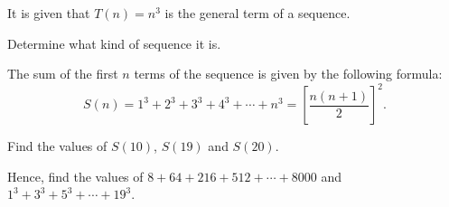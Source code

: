  It is given that $T(n)=n^3$ is the general term of a sequence.

\begin{subparts}
  \item Determine what kind of sequence it is.
  \item The sum of the first $n$ terms of the sequence is given by the following formula:
  \[
  S(n)=1^3+2^3+3^3+4^3+\cdots+n^3=\left[\frac{n(n+1)}{2}\right]^2.
  \]
  \begin{subpartsii}
    \item Find the values of $S(10)$, $S(19)$ and $S(20)$.
    \item Hence, find the values of $8+64+216+512+\cdots+8000$ and $1^3+3^3+5^3+\cdots+19^3$.
  \end{subpartsii}
\end{subparts}


